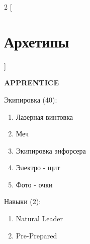 \begin{multicols}{2}
    [
    \section{Архетипы}
    ]
    

    \textbf{APPRENTICE}

    Экипировка (40):
    \begin{enumerate}
        \item Лазерная винтовка
        \item Меч
        \item Экипировка энфорсера
        \item Электро - щит
        \item Фото - очки
    \end{enumerate}

    Навыки (2):
    \begin{enumerate}
        \item Natural Leader
        \item Pre-Prepared
    \end{enumerate}
\end{multicols}